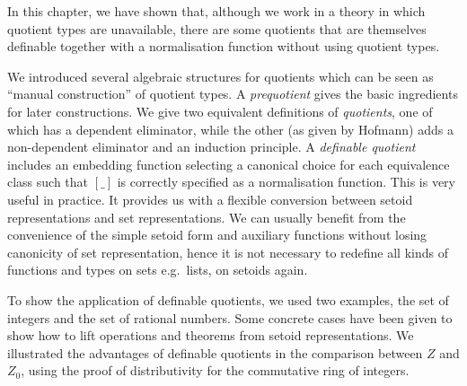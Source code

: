 In this chapter, we have shown that, 
although we work in a theory in which quotient types are unavailable,
there are some quotients that are
themselves definable together with a normalisation function without using quotient types. 

We introduced several
algebraic structures for quotients which can be seen as ``manual construction'' of quotient types.
A \emph{prequotient} gives the basic ingredients for later
constructions. We give two equivalent definitions of \emph{quotients},
one of which has a dependent eliminator, while the other (as given by Hofmann) adds
 a non-dependent eliminator and an induction principle.
A \emph{definable quotient} includes an embedding function selecting a canonical choice for each
equivalence class such that $[\_]$ is correctly specified as a normalisation function. 
This is very useful in practice.
It provides us with a flexible conversion between setoid representations and set representations.
We can usually benefit from the convenience of the simple setoid form and auxiliary functions without losing canonicity of set representation, hence it is not necessary to redefine all kinds of functions and types on sets e.g.\ lists, on setoids again.

To show the application of definable quotients, we
used two examples, the set of integers and the set of rational
numbers. Some concrete cases have been given to show how to lift operations and theorems from setoid representations.
We illustrated the advantages of definable quotients in the comparison between $Z$ and $Z_0$, using the proof of distributivity for the commutative ring of integers.




